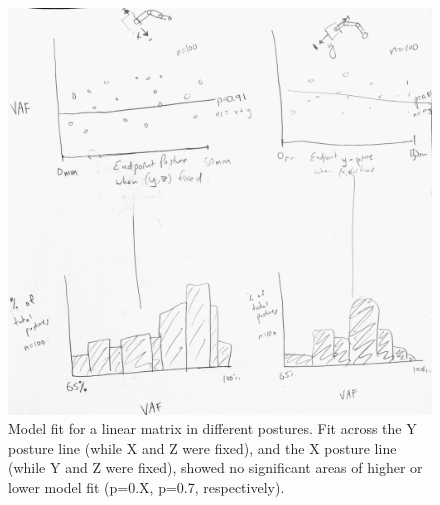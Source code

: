\documentclass[utf8]{frontiersSCNS} %
\begin{document}
\begin{figure}[h!]
\begin{center}
\includegraphics[width=17.5cm]{figures/model_fit/model_fit.jpg}%
\end{center}
\caption{Model fit for a linear matrix in different postures. Fit across the Y posture line (while X and Z were fixed), and the X posture line (while Y and Z were fixed), showed no significant areas of higher or lower model fit (p=0.X, p=0.7, respectively).}
\label{fig:model_fit}
\end{figure}
\end{document}
